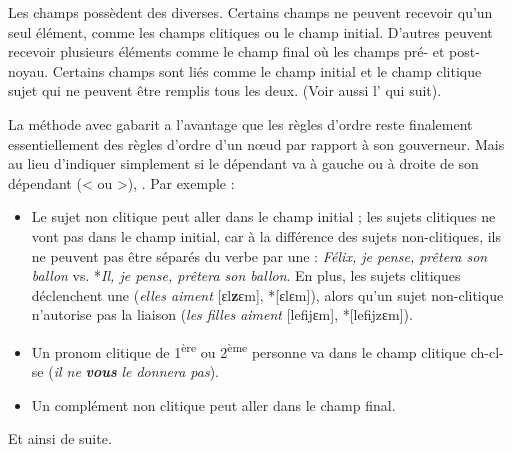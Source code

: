 Les champs possèdent des  diverses. Certains champs ne peuvent recevoir qu’un seul élément, comme les champs clitiques ou le champ initial. D’autres peuvent recevoir plusieurs éléments comme le champ final où les champs pré- et post-noyau. Certains champs sont liés comme le champ initial et le champ clitique sujet qui ne peuvent être remplis tous les deux. (Voir aussi l’ qui suit).

La méthode avec gabarit a l’avantage que les règles d’ordre reste finalement essentiellement des règles d’ordre d’un nœud par rapport à son gouverneur. Mais au lieu d’indiquer simplement si le dépendant va à gauche ou à droite de son dépendant (< ou >),  . Par exemple :

\begin{itemize}
\item Le sujet non clitique peut aller dans le champ initial ; les sujets clitiques ne vont pas dans le champ initial, car à la différence des sujets non-clitiques, ils ne peuvent pas être séparés du verbe par une  : \textit{Félix, je pense, prêtera son ballon} vs. *\textit{Il, je pense, prêtera son ballon}. En plus, les sujets clitiques déclenchent une  (\textit{elles aiment} [ɛl\textbf{z}ɛm], *[ɛlɛm]), alors qu'un sujet non-clitique n'autorise pas la liaison (\textit{les filles aiment} [lefijɛm], *[lefijzɛm]).
\item Un pronom clitique de 1\textsuperscript{ère} ou 2\textsuperscript{ème} personne va dans le champ clitique ch-cl-se (\textit{il ne} \textbf{\textit{vous}} \textit{le donnera pas}).
\item Un complément non clitique peut aller dans le champ final.
\end{itemize}

Et ainsi de suite.

